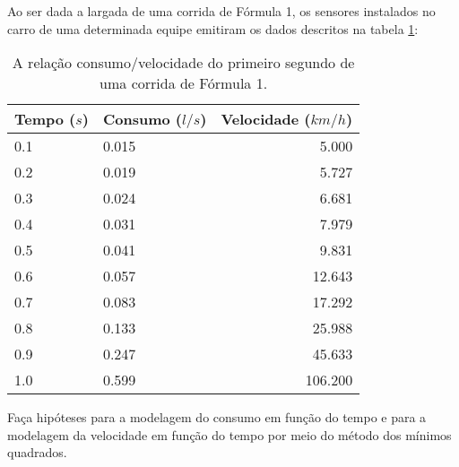 \begin{ex}
Ao ser dada a largada de uma corrida de Fórmula 1, os sensores instalados no carro de uma determinada equipe emitiram os dados descritos na tabela \ref{f1}:

\begin{table}[htb]
\centering
\caption{A relação consumo/velocidade do primeiro segundo de uma corrida de Fórmula 1.}
\label{f1}
\begin{tabular}{@{}llr@{}}
\toprule
Tempo ($s$) & Consumo ($l/s$) & Velocidade ($km/h$) \\ \midrule
0.1         & 0.015           & 5.000               \\
0.2         & 0.019           & 5.727               \\
0.3         & 0.024           & 6.681               \\
0.4         & 0.031           & 7.979               \\
0.5         & 0.041           & 9.831               \\
0.6         & 0.057           & 12.643              \\
0.7         & 0.083           & 17.292              \\
0.8         & 0.133           & 25.988              \\
0.9         & 0.247           & 45.633              \\
1.0         & 0.599           & 106.200             \\ \bottomrule
\end{tabular}
\end{table}
Faça hipóteses para a modelagem do consumo em função do tempo e para a modelagem da velocidade em função do tempo por meio do método dos mínimos quadrados.
 
\end{ex}
